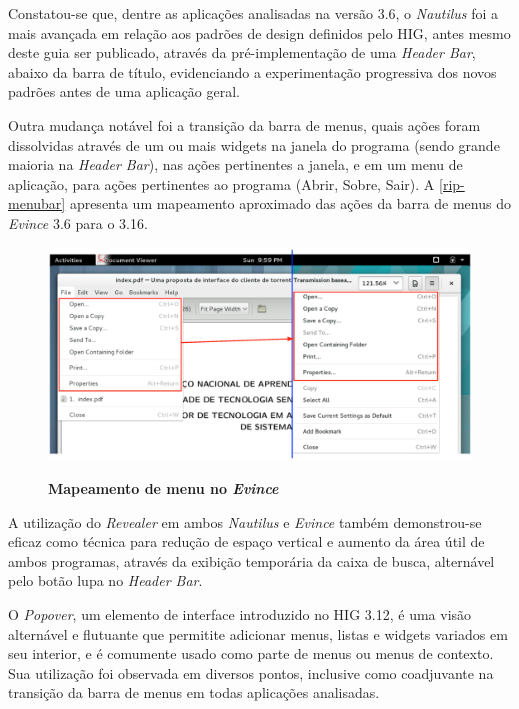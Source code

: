 Constatou-se que, dentre as aplicações analisadas na versão 3.6, o
\textit{Nautilus} foi a mais avançada em relação aos padrões de design definidos
pelo HIG, antes mesmo deste guia ser publicado, através da pré-implementação de
uma \textit{Header Bar}, abaixo da barra de título, evidenciando a
experimentação progressiva dos novos padrões antes de uma aplicação geral.

Outra mudança notável foi a transição da barra de menus, quais ações foram
dissolvidas através de um ou mais widgets na janela do programa (sendo grande
maioria na \textit{Header Bar}), nas ações pertinentes a janela, e em um menu de
aplicação, para ações pertinentes ao programa (Abrir, Sobre, Sair). A
\autoref{rip-menubar} apresenta um mapeamento aproximado das ações da barra de 
menus do \textit{Evince} 3.6 para o 3.16.

\begin{figure}[!ht]
  \begin{center}
    \caption{\textbf{Mapeamento de menu no \textit{Evince}}}
    \includegraphics [width=\textwidth]{image/evince-menubar-mapping.eps}
    \label{rip-menubar}
  \end{center}
\end{figure}

A utilização do \textit{Revealer} em ambos \textit{Nautilus} e \textit{Evince}
também demonstrou-se eficaz como técnica para redução de espaço vertical e
aumento da área útil de ambos programas, através da exibição temporária da caixa
de busca, alternável pelo botão lupa no \textit{Header Bar}.

O \textit{Popover}, um elemento de interface introduzido no HIG 3.12, é uma
visão alternável e flutuante que permitite adicionar menus, listas e widgets
variados em seu interior, e é comumente usado como parte de menus ou menus de
contexto. Sua utilização foi observada em diversos pontos, inclusive como
coadjuvante na transição da barra de menus em todas aplicações analisadas.

